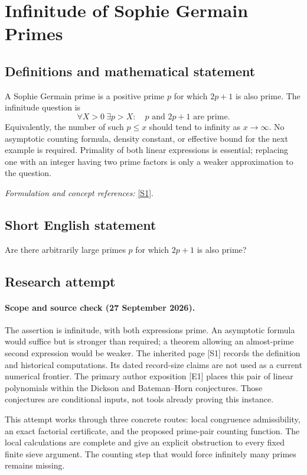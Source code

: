 \documentclass[11pt]{article}
\begin{document}
\section*{\texorpdfstring{Infinitude of Sophie Germain Primes}{Infinitude of Sophie Germain Primes}}\label{390}
\subsection{Definitions and mathematical statement}
A Sophie Germain prime is a positive prime $p$ for which $2p+1$ is also prime. The infinitude question is
\[
 \forall X>0\ \exists p>X:\quad p\text{ and }2p+1\text{ are prime}.
\]
Equivalently, the number of such $p\le x$ should tend to infinity as $x\to\infty$. No asymptotic counting formula, density constant, or effective bound for the next example is required. Primality of both linear expressions is essential; replacing one with an integer having two prime factors is only a weaker approximation to the question.
\par\smallskip\textit{Formulation and concept references:} \href{https://mathworld.wolfram.com/SophieGermainPrime.html}{[S1]}.

\subsection{Short English statement}
Are there arbitrarily large primes $p$ for which $2p+1$ is also prime?
\subsection{Research attempt}
\paragraph{Scope and source check (27 September 2026).}
The assertion is infinitude, with both expressions prime. An asymptotic formula would suffice but is stronger than required; a theorem allowing an almost-prime second expression would be weaker. The inherited page [S1] records the definition and historical computations. Its dated record-size claims are not used as a current numerical frontier. The primary author exposition [E1] places this pair of linear polynomials within the Dickson and Bateman--Horn conjectures. Those conjectures are conditional inputs, not tools already proving this instance.

This attempt works through three concrete routes: local congruence admissibility, an exact factorial certificate, and the proposed prime-pair counting function. The local calculations are complete and give an explicit obstruction to every fixed finite sieve argument. The counting step that would force infinitely many primes remains missing.
\end{document}
